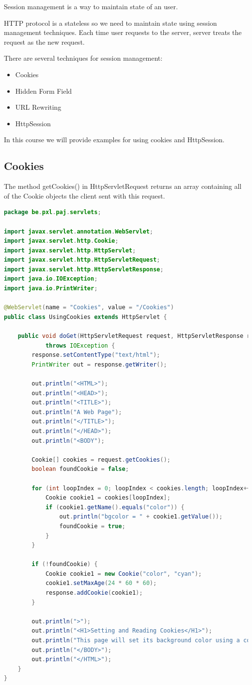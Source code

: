 Session management is a way to maintain state of an user. 

HTTP protocol is a stateless so we need to maintain state using session management techniques. Each time user requests to the server, server treats the request as the new request. 

There are several techniques for session management:

\begin{itemize}
\item Cookies
\item Hidden Form Field
\item URL Rewriting
\item HttpSession
\end{itemize}

In this course we will provide examples for using cookies and HttpSession.

\subsection{Cookies}

The method getCookies() in HttpServletRequest returns an array containing all of the Cookie objects the client sent with this request. 

\begin{lstlisting}[language=java, frame=single]
package be.pxl.paj.servlets;

import javax.servlet.annotation.WebServlet;
import javax.servlet.http.Cookie;
import javax.servlet.http.HttpServlet;
import javax.servlet.http.HttpServletRequest;
import javax.servlet.http.HttpServletResponse;
import java.io.IOException;
import java.io.PrintWriter;

@WebServlet(name = "Cookies", value = "/Cookies")
public class UsingCookies extends HttpServlet {

	public void doGet(HttpServletRequest request, HttpServletResponse response)
			throws IOException {
		response.setContentType("text/html");
		PrintWriter out = response.getWriter();

		out.println("<HTML>");
		out.println("<HEAD>");
		out.println("<TITLE>");
		out.println("A Web Page");
		out.println("</TITLE>");
		out.println("</HEAD>");
		out.println("<BODY");

		Cookie[] cookies = request.getCookies();
		boolean foundCookie = false;

		for (int loopIndex = 0; loopIndex < cookies.length; loopIndex++) {
			Cookie cookie1 = cookies[loopIndex];
			if (cookie1.getName().equals("color")) {
				out.println("bgcolor = " + cookie1.getValue());
				foundCookie = true;
			}
		}

		if (!foundCookie) {
			Cookie cookie1 = new Cookie("color", "cyan");
			cookie1.setMaxAge(24 * 60 * 60);
			response.addCookie(cookie1);
		}

		out.println(">");
		out.println("<H1>Setting and Reading Cookies</H1>");
		out.println("This page will set its background color using a cookie when reloaded.");
		out.println("</BODY>");
		out.println("</HTML>");
	}
}
\end{lstlisting}

